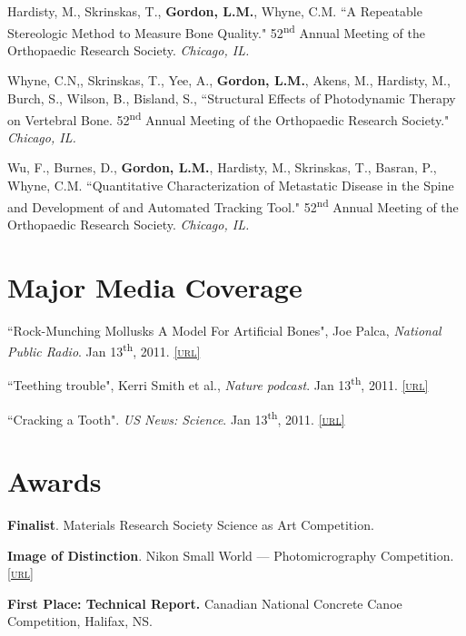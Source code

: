 Hardisty, M., Skrinskas, T., \textbf{Gordon, L.M.}, Whyne, C.M. ``A Repeatable Stereologic Method to Measure Bone Quality." 52\textsuperscript{nd} Annual Meeting of the Orthopaedic Research Society. \emph{Chicago, IL.}

Whyne, C.N,, Skrinskas, T., Yee, A., \textbf{Gordon, L.M.}, Akens, M., Hardisty, M., Burch, S., Wilson, B., Bisland, S., ``Structural Effects of Photodynamic Therapy on Vertebral Bone. 52\textsuperscript{nd} Annual Meeting of the Orthopaedic Research Society." \emph{Chicago, IL.}

Wu, F., Burnes, D., \textbf{Gordon, L.M.}, Hardisty, M., Skrinskas, T., Basran, P., Whyne, C.M. ``Quantitative Characterization of Metastatic Disease in the Spine and Development of and Automated Tracking Tool." 52\textsuperscript{nd} Annual Meeting of the Orthopaedic Research Society. \emph{Chicago, IL.}
\endgroup

\section*{Major Media Coverage}
``Rock-Munching Mollusks A Model For Artificial Bones", Joe Palca, \emph{National Public Radio}. Jan 13\textsuperscript{th}, 2011. \href{http://www.npr.org/2011/01/13/132859853/rock-munching-mollusks-a-model-for-artificial-bones}{\textsc{\footnotesize{[url]}}}

\begingroup\setlength{\parskip}{0.1cm}
``Teething trouble", Kerri Smith et al., \emph{Nature podcast}. Jan 13\textsuperscript{th}, 2011. \href{http://www.nature.com/nature/podcast/index-2011-01-13.html}{\textsc{\footnotesize{[url]}}}

 ``Cracking a Tooth". \emph{US News: Science}. Jan 13\textsuperscript{th}, 2011. \href{http://www.usnews.com/science/articles/2011/01/13/cracking-a-tooth}{\textsc{\footnotesize{[url]}}}
\endgroup

\section*{Awards}
\textbf{Finalist}. Materials Research Society Science as Art Competition.

\begingroup\setlength{\parskip}{0.1cm}
\textbf{Image of Distinction}. Nikon Small World --- Photomicrography Competition. \href{http://www.nikonsmallworld.com/detail/year/2009/66}{\textsc{\footnotesize{[url]}}}

\textbf{First Place: Technical Report.} Canadian National Concrete Canoe Competition, Halifax, NS.

